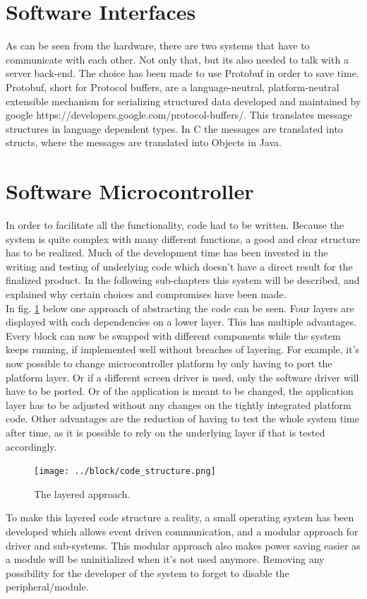 \section{Software Interfaces}
As can be seen from the hardware, there are two systems that have to communicate with each other. Not only that, but its also needed to talk with a server back-end. The choice has been made to use Protobuf in order to save time. Protobuf, short for Protocol buffers, are a language-neutral, platform-neutral extensible mechanism for serializing structured data developed and maintained by google https://developers.google.com/protocol-buffers/. This translates message structures in language dependent types. In C the messages are translated into structs, where the messages are translated into Objects in Java.
\section{Software Microcontroller}
\label{sec:software}
In order to facilitate all the functionality, code had to be written. Because the system is quite complex with many different functions, a good and clear structure has to be realized. Much of the development time has been invested in the writing and testing of underlying code which doesn’t have a direct result for the finalized product. In the following sub-chapters this system will be described, and explained why certain choices and compromises have been made.\\
In fig. \ref{fig:code_structure} below one approach of abstracting the code can be seen. Four layers are displayed with each dependencies on a lower layer. This has multiple advantages. Every block can now be swapped with different components while the system keeps running, if implemented well without breaches of layering.\newpar
For example, it's now possible to change microcontroller platform by only having to port the platform layer. Or if a different screen driver is used, only the software driver will have to be ported. Or of the application is meant to be changed, the application layer  has to be adjusted without any changes on the tightly integrated platform code. Other advantages are the reduction of having to test the whole system time after time, as it is possible to rely on the underlying layer if that is tested accordingly.\\

\begin{figure}[H]
	\centering
	\label{fig:code_structure}
	\texttt{[image: ../block/code\_structure.png]}
	\caption{The layered approach.}
\end{figure}
To make this layered code structure a reality, a small operating system has been developed which allows event driven communication, and a modular approach for driver and sub-systems. This modular approach also makes power saving easier as a module will be uninitialized when it's not used anymore. Removing any possibility for the developer of the system to forget to disable the peripheral/module.\newpar

